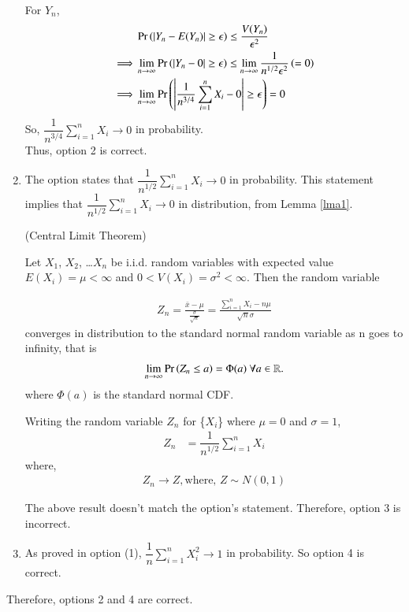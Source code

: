 \documentclass[journal,12pt,twocolumn]{IEEEtran}
\begin{document}
\begin{enumerate}
For $Y_n$, 
\begin{align}
    &\Pr\left(\vert Y_n-E(Y_n)\vert\geq \epsilon\right) \leq \dfrac{V(Y_n)}{\epsilon^2}\\
    \implies &\lim_{n \to \infty}\Pr\left(|Y_n-0|\geq \epsilon\right) \leq \lim_{n \to \infty }\dfrac{1}{n^{1/2}\epsilon^2}\left(=0\right)\\
    \implies &\lim_{n \to \infty}\Pr\left(\left | \dfrac{1}{n^{3/4}}\sum_{i=1}^n X_i - 0 \right|\geq \epsilon\right)=0
\end{align}
So, $\dfrac{1}{n^{3/4}}\sum_{i=1}^n X_i \to 0$ in probability.\\
Thus, option 2 is correct.

\item The option states that
\begin{math}
 \dfrac{1}{n^{1/2}} \sum_{i=1}^n X_i \to 0
\end{math} 
in probability. This statement implies that $\dfrac{1}{n^{1/2}} \sum_{i=1}^n X_i \to 0$ in distribution, from Lemma \ref{lma1}.\vspace{0.2cm}

\begin{lemma}\label{lma2}
    (Central Limit Theorem)

Let $X_1$, $X_2$, \ldots $X_n$ be i.i.d. random variables with expected value $E(X_i)=\mu < \infty$  and $0 < V(X_i)=\sigma^2 < \infty$. Then the random variable 

\begin{align}
    Z_n = \frac{\bar{x} - \mu}{\frac{\sigma}{\sqrt{n}}} = \frac{\sum_{i=1}^n X_i - n\mu}{\sqrt{n}\sigma}
\end{align}
converges in distribution to the standard normal random variable as n goes to infinity, that is
\begin{align}
    \lim_{n \to \infty}\Pr\left(Z_n \leq a\right) = \Phi(a)   \text{        }\forall a \in \mathbb{R}.
\end{align}
where $\Phi(a)$ is the standard normal CDF.
\end{lemma}

Writing the random variable $Z_n$ for \{$X_i$\} where $\mu=0$ and $\sigma=1$,
\begin{align}
    Z_n &= \dfrac{1}{n^{1/2}} \sum_{i=1}^n X_i
\end{align}
where, 
\begin{align}
    Z_n \to Z, \text{where, } Z \sim N(0,1)
\end{align}

The above result doesn't match the option's statement. Therefore, option 3 is incorrect.

\item As proved in option (1), $\dfrac{1}{n}\sum_{i=1}^n X_i^2 \to 1$ in probability. So option 4 is correct.
\end{enumerate}
Therefore, options 2 and 4 are correct.
\end{document}
